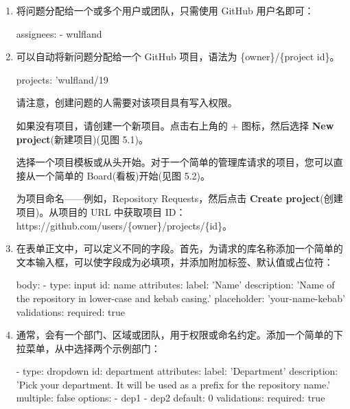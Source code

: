 \begin{enumerate}
\item 
将问题分配给一个或多个用户或团队，只需使用 GitHub 用户名即可：

\begin{shell}
assignees:
  - wulfland
\end{shell}

\item 
可以自动将新问题分配给一个 GitHub 项目，语法为 \{owner\}/\{project id\}。

\begin{shell}
projects: 'wulfland/19
\end{shell}

请注意，创建问题的人需要对该项目具有写入权限。

如果没有项目，请创建一个新项目。点击右上角的 + 图标，然后选择 \textbf{New project}(新建项目)(见图 5.1)。


选择一个项目模板或从头开始。对于一个简单的管理库请求的项目，您可以直接从一个简单的 Board(看板)开始(见图 5.2)。


为项目命名——例如，Repository Requests，然后点击 \textbf{Create project}(创建项目)。从项目的 URL 中获取项目 ID：https://github.com/users/\{owner\}/projects/\{id\}。

\item 
在表单正文中，可以定义不同的字段。首先，为请求的库名称添加一个简单的文本输入框，可以使字段成为必填项，并添加附加标签、默认值或占位符：

\begin{shell}
body:
  - type: input
    id: name
    attributes:
      label: 'Name'
      description: 'Name of the repository in lower-case and
kebab casing.'
      placeholder: 'your-name-kebab'
    validations:
      required: true
\end{shell}

\item 
通常，会有一个部门、区域或团队，用于权限或命名约定。添加一个简单的下拉菜单，从中选择两个示例部门：

\begin{shell}
- type: dropdown
  id: department
  attributes:
    label: 'Department'
    description: 'Pick your department. It will be used as a   prefix for the repository name.'
    multiple: false
    options:
      - dep1
      - dep2
    default: 0
  validations:
    required: true
\end{shell}


\end{enumerate}
